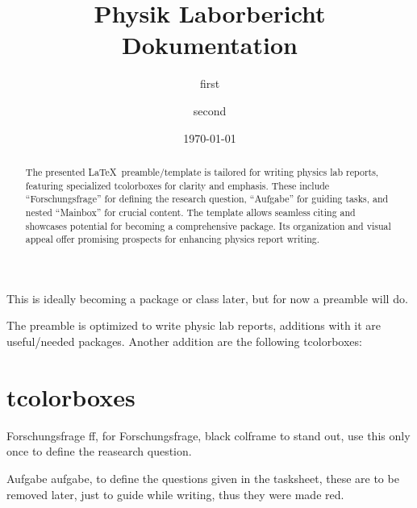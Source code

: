 \documentclass[twocolumn]{article}
\begin{document}
\begin{titlingpage}
    \title{Physik Laborbericht Dokumentation}

    \author{first}

    \author{second}

    \date{\today}

    \maketitle

    \vspace{2.5cm}

    \begin{abstract}
        The presented \LaTeX\ preamble/template is tailored for writing physics lab
        reports, featuring specialized tcolorboxes for clarity and emphasis. These
        include ``Forschungsfrage'' for defining the research question, ``Aufgabe'' for
        guiding tasks, and nested ``Mainbox'' for crucial content. The template allows
        seamless citing and showcases potential for becoming a comprehensive package.
        Its organization and visual appeal offer promising prospects for enhancing
        physics report writing.
    \end{abstract}
\end{titlingpage}





This is ideally becoming a package or class later, but for now a preamble will do.

The preamble is optimized to write physic lab reports, additions with it are
useful/needed packages. Another addition are the following tcolorboxes:
    



\section{tcolorboxes}
\label{sec:tcol}


\begin{ff}{Forschungsfrage}
    ff, for Forschungsfrage, black colframe to stand out, use this only once to define the reasearch question.
\label{Forschungsfrage}
\end{ff}


\begin{aufgabe}{Aufgabe}
    aufgabe, to define the questions given in the tasksheet, these are to be
    removed later, just to guide while writing, thus they were made red.
\label{aufgabe-1}
\end{aufgabe}
\end{document}
